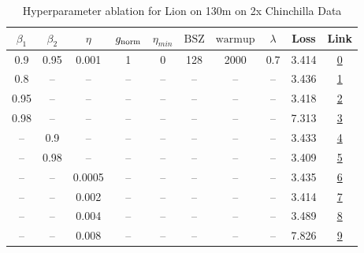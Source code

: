 \begin{table}[H]
\centering
\caption{Hyperparameter ablation for Lion on 130m on 2x Chinchilla Data}
\label{tab:ablation_lion_130m_on_2x_chinchilla_data}
\begin{tabular}{cccccccccc}
\toprule
$\beta_1$ & $\beta_2$ & $\eta$ & $g_{\mathrm{norm}}$ & $\eta_{min}$ & $\mathrm{BSZ}$ & $\mathrm{warmup}$ & $\lambda$ & Loss & Link \\
\midrule
0.9 & 0.95 & 0.001 & 1 & 0 & 128 & 2000 & 0.7 & 3.414 & \href{https://wandb.ai/marin-community/optimizer-scaling/runs/sweep-130m-5B-lione0352dlr0.001-wd0.7-minlr0-warmup2000-b10.9-b2-89e6a1}{0} \\
\midrule
0.8 & -- & -- & -- & -- & -- & -- & -- & 3.436 & \href{https://wandb.ai/marin-community/optimizer-scaling/runs/sweep-130m-5B-lion50b543lr0.001-wd0.7-minlr0-warmup2000-b10.8-b2-b6925d}{1} \\
0.95 & -- & -- & -- & -- & -- & -- & -- & 3.418 & \href{https://wandb.ai/marin-community/optimizer-scaling/runs/sweep-130m-5B-liondeda64lr0.001-wd0.7-minlr0-warmup2000-b10.95-b-005903}{2} \\
0.98 & -- & -- & -- & -- & -- & -- & -- & 7.313 & \href{https://wandb.ai/marin-community/optimizer-scaling/runs/sweep-130m-5B-lion2ccccblr0.001-wd0.7-minlr0-warmup2000-b10.98-b-ce81dd}{3} \\
-- & 0.9 & -- & -- & -- & -- & -- & -- & 3.433 & \href{https://wandb.ai/marin-community/optimizer-scaling/runs/sweep-130m-5B-lion9321cblr0.001-wd0.7-minlr0-warmup2000-b10.9-b2-f29f78}{4} \\
-- & 0.98 & -- & -- & -- & -- & -- & -- & 3.409 & \href{https://wandb.ai/marin-community/optimizer-scaling/runs/sweep-130m-5B-lion5d07e9lr0.001-wd0.7-minlr0-warmup2000-b10.9-b2-6d65d0}{5} \\
-- & -- & 0.0005 & -- & -- & -- & -- & -- & 3.435 & \href{https://wandb.ai/marin-community/optimizer-scaling/runs/sweep-130m-5B-lionb0bcd6lr0.0005-wd0.7-minlr0-warmup2000-b10.9-b-409f2d}{6} \\
-- & -- & 0.002 & -- & -- & -- & -- & -- & 3.414 & \href{https://wandb.ai/marin-community/optimizer-scaling/runs/sweep-130m-5B-lion806a2blr0.002-wd0.7-minlr0-warmup2000-b10.9-b2-4fa558}{7} \\
-- & -- & 0.004 & -- & -- & -- & -- & -- & 3.489 & \href{https://wandb.ai/marin-community/optimizer-scaling/runs/sweep-130m-5B-lion183c87lr0.004-wd0.7-minlr0-warmup2000-b10.9-b2-3f102b}{8} \\
-- & -- & 0.008 & -- & -- & -- & -- & -- & 7.826 & \href{https://wandb.ai/marin-community/optimizer-scaling/runs/sweep-130m-5B-lion99fb2blr0.008-wd0.7-minlr0-warmup2000-b10.9-b2-4c4fe7}{9} \\

\end{tabular}
\end{table}
